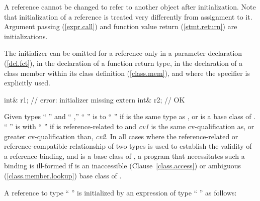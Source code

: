 \pnum
A reference cannot be changed to refer to another object after initialization.
%
Note that initialization of a reference is treated very differently from assignment
to it.
%
Argument passing (\ref{expr.call})
%
and function value return (\ref{stmt.return}) are initializations.

\pnum
The initializer can be omitted for a reference only in a parameter declaration
(\ref{dcl.fct}), in the declaration of a function return type, in the declaration of
a class member within its class definition (\ref{class.mem}), and where the
specifier is explicitly used.
%
\enterexample

\begin{codeblock}
int& r1;                        // error: initializer missing
extern int& r2;                 // OK
\end{codeblock}
\exitexample

\pnum
Given types `` '' and `` ,''
`` '' is  to
%
`` '' if
is the same type as
,
or
is a base class of
.
`` '' is 
%
with `` '' if
is reference-related to
and
\textit{cv1}
is the same cv-qualification as, or greater cv-qualification than,
\textit{cv2}.
In all cases where the reference-related or reference-compatible relationship
of two types is used to establish the validity of a reference binding, and
is a base class of
,
a program that necessitates such a binding is ill-formed if
is an inaccessible (Clause~\ref{class.access}) or ambiguous (\ref{class.member.lookup})
base class of
.

\pnum
A reference to type `` '' is initialized by
an expression of type `` '' as follows:%

